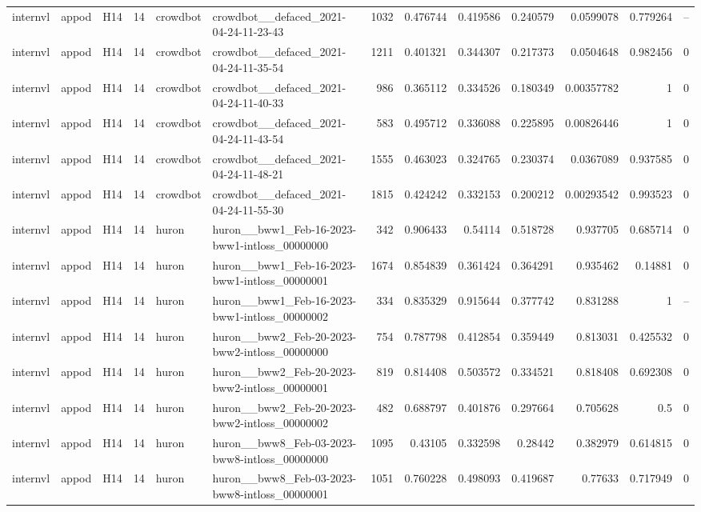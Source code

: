 \begin{longtable}{lllrllrrrrrrr}
internvl & appod & H14 & 14 & crowdbot & crowdbot\_\_defaced\_2021-04-24-11-23-43 & 1032 & 0.476744 & 0.419586 & 0.240579 & 0.0599078 & 0.779264 & -- \\
internvl & appod & H14 & 14 & crowdbot & crowdbot\_\_defaced\_2021-04-24-11-35-54 & 1211 & 0.401321 & 0.344307 & 0.217373 & 0.0504648 & 0.982456 & 0 \\
internvl & appod & H14 & 14 & crowdbot & crowdbot\_\_defaced\_2021-04-24-11-40-33 & 986 & 0.365112 & 0.334526 & 0.180349 & 0.00357782 & 1 & 0 \\
internvl & appod & H14 & 14 & crowdbot & crowdbot\_\_defaced\_2021-04-24-11-43-54 & 583 & 0.495712 & 0.336088 & 0.225895 & 0.00826446 & 1 & 0 \\
internvl & appod & H14 & 14 & crowdbot & crowdbot\_\_defaced\_2021-04-24-11-48-21 & 1555 & 0.463023 & 0.324765 & 0.230374 & 0.0367089 & 0.937585 & 0 \\
internvl & appod & H14 & 14 & crowdbot & crowdbot\_\_defaced\_2021-04-24-11-55-30 & 1815 & 0.424242 & 0.332153 & 0.200212 & 0.00293542 & 0.993523 & 0 \\
internvl & appod & H14 & 14 & huron & huron\_\_bww1\_Feb-16-2023-bww1-intloss\_00000000 & 342 & 0.906433 & 0.54114 & 0.518728 & 0.937705 & 0.685714 & 0 \\
internvl & appod & H14 & 14 & huron & huron\_\_bww1\_Feb-16-2023-bww1-intloss\_00000001 & 1674 & 0.854839 & 0.361424 & 0.364291 & 0.935462 & 0.14881 & 0 \\
internvl & appod & H14 & 14 & huron & huron\_\_bww1\_Feb-16-2023-bww1-intloss\_00000002 & 334 & 0.835329 & 0.915644 & 0.377742 & 0.831288 & 1 & -- \\
internvl & appod & H14 & 14 & huron & huron\_\_bww2\_Feb-20-2023-bww2-intloss\_00000000 & 754 & 0.787798 & 0.412854 & 0.359449 & 0.813031 & 0.425532 & 0 \\
internvl & appod & H14 & 14 & huron & huron\_\_bww2\_Feb-20-2023-bww2-intloss\_00000001 & 819 & 0.814408 & 0.503572 & 0.334521 & 0.818408 & 0.692308 & 0 \\
internvl & appod & H14 & 14 & huron & huron\_\_bww2\_Feb-20-2023-bww2-intloss\_00000002 & 482 & 0.688797 & 0.401876 & 0.297664 & 0.705628 & 0.5 & 0 \\
internvl & appod & H14 & 14 & huron & huron\_\_bww8\_Feb-03-2023-bww8-intloss\_00000000 & 1095 & 0.43105 & 0.332598 & 0.28442 & 0.382979 & 0.614815 & 0 \\
internvl & appod & H14 & 14 & huron & huron\_\_bww8\_Feb-03-2023-bww8-intloss\_00000001 & 1051 & 0.760228 & 0.498093 & 0.419687 & 0.77633 & 0.717949 & 0 \\

\end{longtable}
